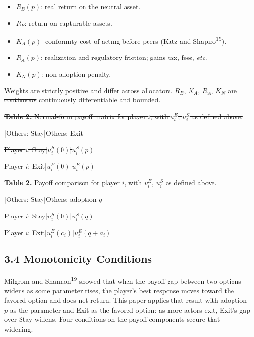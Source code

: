 \documentclass[12pt]{article}
\theoremstyle{definition}
\theoremstyle{remark}
\providecommand{\DIFaddtex}[1]{{\color{AddedText}#1}}
\providecommand{\DIFdeltex}[1]{{\color{DeletedText}\sout{#1}}}
\providecommand{\DIFaddbegin}{}
\providecommand{\DIFaddend}{}
\providecommand{\DIFdelbegin}{}
\providecommand{\DIFdelend}{}
\providecommand{\DIFadd}[1]{\texorpdfstring{\DIFaddtex{#1}}{#1}} %
\providecommand{\DIFdel}[1]{\texorpdfstring{\DIFdeltex{#1}}{}} %
\begin{document}
\begin{itemize}[nosep,leftmargin=*]
\item $R_B(p)$: real return on the neutral asset.
\item $R_F$: return on capturable assets.
\item $K_A(p)$: conformity cost of acting before peers (Katz and Shapiro\textsuperscript{15}).
\item $R_A(p)$: realization and regulatory friction; gains tax, fees, \textit{etc}.
\item $K_N(p)$: non-adoption penalty.
\end{itemize}

\smallskip
\noindent Weights are strictly positive and differ across allocators. $R_B$, $K_A$, $R_A$, $K_N$ are \DIFdelbegin \DIFdel{continuous }\DIFdelend \DIFaddbegin \DIFadd{continuously differentiable }\DIFaddend and bounded.



\DIFdelbegin 
\par\medskip
\DIFdel{\textbf{Table 2.} Normal-form payoff matrix for player $i$, with $u_i^E$, $u_i^S$ as defined above.}\par
\DIFdel{\quad |\quad Others: Stay\quad |\quad Others: Exit}\par
\DIFdel{Player $i$: Stay\quad |\quad $u_i^S(0)$\quad |\quad $u_i^S(p)$}\par
\DIFdel{Player $i$: Exit\quad |\quad $u_i^E(0)$\quad |\quad $u_i^E(p)$}\par
\medskip
\DIFdelend \DIFaddbegin 
\par\medskip
\DIFadd{\textbf{Table 2.} Payoff comparison for player $i$, with $u_i^E$, $u_i^S$ as defined above.}\par
\DIFadd{\quad |\quad Others: Stay\quad |\quad Others: adoption $q$}\par
\DIFadd{Player $i$: Stay\quad |\quad $u_i^S(0)$\quad |\quad $u_i^S(q)$}\par
\DIFadd{Player $i$: Exit\quad |\quad $u_i^E(a_i)$\quad |\quad $u_i^E(q+a_i)$}\par
\medskip
\DIFaddend 



\subsection{3.4 Monotonicity Conditions}

Milgrom and Shannon\textsuperscript{19} showed that when the payoff
gap between two options widens as some parameter rises, the player's
best response moves toward the favored option and does not return.
This paper applies that result with adoption $p$ as the parameter
and Exit as the favored option: as more actors exit, Exit's gap
over Stay widens. Four conditions on the payoff components secure
that widening.
\end{document}
